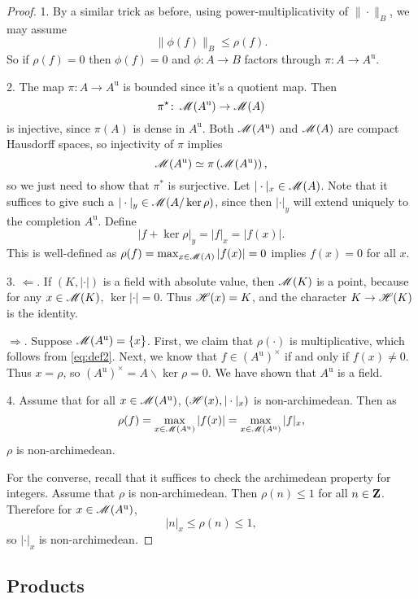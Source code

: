 \begin{proof}
1. By a similar trick as before, using power-multiplicativity of $\|\cdot\|_B$, we may assume
\[
  \|\phi(f)\|_B\leqslant \rho(f).
\]
So if $\rho(f)=0$ then $\phi(f)=0$ and $\phi\colon A\to B$ factors through 
$\pi\colon A\to A^\mathrm{u}$.

2. The map $\pi\colon A\to A^\mathrm{u}$ is bounded since it's a quotient map. Then
\[
  \pi^\star\colon \operatorname{\mathscr{M}}(A^\mathrm{u})\to\operatorname{\mathscr{M}}(A)
\]
is injective, since $\pi(A)$ is dense in $A^\mathrm{u}$. Both $\operatorname{\mathscr{M}}(A^\mathrm{u})$ 
and $\operatorname{\mathscr{M}}(A)$ are compact Hausdorff spaces, so injectivity of $\pi$ implies
\[
  \operatorname{\mathscr{M}}(A^\mathrm{u})\simeq \pi\left( \operatorname{\mathscr{M}}(A^\mathrm{u}) \right),
\]
so we just need to show that $\pi^\ast$ is surjective. Let 
$|\cdot|_x\in \operatorname{\mathscr{M}}(A)$. Note that it suffices to give such a 
$|\cdot|_y\in\operatorname{\mathscr{M}}(A/\ker\rho)$, since then $|\cdot|_y$ will extend uniquely 
to the completion $A^\mathrm{u}$. Define
\[
  |f+\ker\rho|_y=|f|_x=|f(x)|.
\]
This is well-defined as $\rho(f)=\max_{x\in\operatorname{\mathscr{M}}(A)}|f(x)|=0$ implies $f(x)=0$ 
for all $x$.

3. $\Leftarrow$. If $(K,|\cdot|)$ is a field with absolute value, then 
$\operatorname{\mathscr{M}}(K)$ is a point, because for any $x\in \operatorname{\mathscr{M}}(K)$, 
$\ker|\cdot|=0$. Thus $\mathscr{H}(x)=K$, and the character $K\to \mathscr{H}(K)$ is the 
identity. 

$\Rightarrow$. Suppose $\operatorname{\mathscr{M}}(A^\mathrm{u}) = \{x\}$. First, we claim that 
$\rho(\cdot)$ is multiplicative, which follows from \eqref{eq:def2}. Next, we 
know that $f\in (A^\mathrm{u})^\times$ if and only if $f(x)\ne 0$. Thus 
$x=\rho$, so $(A^\mathrm{u})^\times = A\smallsetminus \ker\rho = 0$. We have 
shown that $A^\mathrm{u}$ is a field. 

4. Assume that for all $x\in\operatorname{\mathscr{M}}(A^\mathrm{u})$, $(\mathscr{H}(x),|\cdot|_x)$ is 
non-archimedean. Then as
\[
  \rho(f)=\max_{x\in\operatorname{\mathscr{M}}(A^\mathrm{u})}|f(x)|=\max_{x\in\operatorname{\mathscr{M}}(A^\mathrm{u})}|f|_x,
\]
$\rho$ is non-archimedean.

For the converse, recall that it suffices to check the archimedean property for 
integers. Assume that $\rho$ is non-archimedean. Then $\rho(n)\leqslant 1$ for all 
$n\in\mathbf{Z}$. Therefore for $x\in\operatorname{\mathscr{M}}(A^\mathrm{u})$,
\[
  |n|_x\leqslant\rho(n)\leqslant 1 ,
\]
so $|\cdot|_x$ is non-archimedean.
\end{proof}



\subsection{Products}


